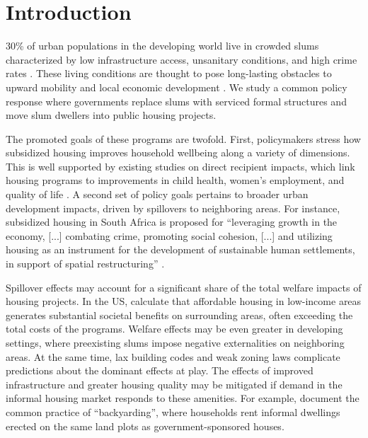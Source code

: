 \documentclass[12pt]{article}
\begin{document}
\section{Introduction} \label{sec:introduction}


30\% of urban populations in the developing world live in crowded slums characterized by low infrastructure access, unsanitary conditions, and high crime rates \citep{mdg}. These living conditions are thought to pose long-lasting obstacles to upward mobility and local economic development \citep{marx2013slums}. We study a common policy response where governments replace slums with serviced formal structures and move slum dwellers into public housing projects. 

The promoted goals of these programs are twofold. First, policymakers stress how subsidized housing improves household wellbeing along a variety of dimensions. This is well supported by existing studies on direct recipient impacts, which link housing programs to improvements in child health, women's employment, and quality of life \citep{cattaneo2009housing,franklin2016enabled,galiani2017shelter}. A second set of policy goals pertains to broader urban development impacts, driven by spillovers to neighboring areas. For instance, subsidized housing in South Africa is proposed for ``leveraging growth in the economy, [...] combating crime, promoting social cohesion, [...] and utilizing housing as an instrument for the development of sustainable human settlements, in support of spatial restructuring'' \citep{bng}. 

Spillover effects may account for a significant share of the total welfare impacts of housing projects.  In the US, \cite{diamond2016wants} calculate that affordable housing in low-income areas generates substantial societal benefits on surrounding areas, often exceeding the total costs of the programs. Welfare effects may be even greater in developing settings, where preexisting slums impose negative externalities on neighboring areas. At the same time, lax building codes and weak zoning laws complicate predictions about the dominant effects at play. The effects of improved infrastructure and greater housing quality may be mitigated if demand in the informal housing market responds to these amenities. For example, \cite{Brueckner2018backyarding} document the common practice of ``backyarding'', where households rent informal dwellings erected on the same land plots as government-sponsored houses. 
\end{document}
